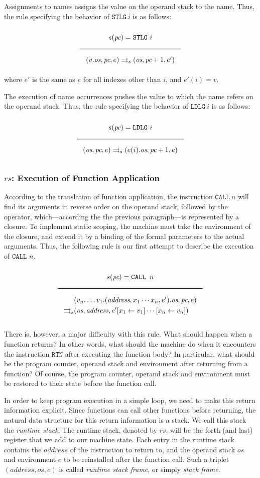\begin{appendices}
Assignments to names assigns the value on the operand stack to the name. Thus, the rule specifying the behavior of \(\texttt{STLG}\ i\) is as follows:

$$\Rule{s(\textit{pc}) = \texttt{STLG}\ i}{
(v.\textit{os},\textit{pc},e) \transition (\textit{os},\textit{pc}+1,e')}$$
where \(e'\) is the same as \(e\) for all indexes other than \(i\), and \(e'(i) = v\).

The execution of name occurrences pushes the value to which the name refers on the operand stack. Thus, the rule specifying the behavior of \(\texttt{LDLG}\ i\) is as follows:

$$\Rule{s(\textit{pc}) = \texttt{LDLG}\ i}{
(\textit{os},\textit{pc},e) \transition (e(i).\textit{os},\textit{pc}+1,e)}$$

\subsubsection{\(\textit{rs}\): Execution of Function Application}
\label{sec:org837eb1c}
According to the translation of function application, the instruction \(\texttt{CALL}\ n\) will find its arguments in reverse order on the operand stack, followed by the operator, which---according the the previous paragraph---is represented by a closure. To implement static scoping, the machine must take the environment of the closure, and extend it by a binding of the formal parameters to the actual arguments. Thus, the following rule is our first attempt to describe the execution of \(\texttt{CALL } n\).

$$\Rule{s(\textit{pc}) = \texttt{CALL } n}{
\begin{aligned}
&(v_n.\ldots v_1.(\textit{address},x_1\cdots x_n,e').\textit{os},\textit{pc},e)\\
\transition &(\textit{os},\textit{address},e'[x_1 \leftarrow v_1]\cdots[x_n \leftarrow v_n])
\end{aligned}}$$

There is, however, a major difficulty with this rule. What should happen when a function returns? In other words, what should the machine do when it encounters the instruction \(\texttt{RTN}\) after executing the function body? In particular, what should be the program counter, operand stack and environment after returning from a function? Of course, the program counter, operand stack and environment must be restored to their state before the function call.

In order to keep program execution in a simple loop, we need to make this return information explicit. Since functions can call other functions before returning, the natural data structure for this return information is a stack. We call this stack the \emph{runtime stack}. The runtime stack, denoted by \(\textit{rs}\), will be the forth (and last) register that we add to our machine state. Each entry in the runtime stack contains the \(\textit{address}\) of the instruction to return to, and the operand stack \(\textit{os}\) and environment \(e\) to be reinstalled after the function call. Such a triplet \((\textit{address},\textit{os},e)\) is called \emph{runtime stack frame}, or simply \emph{stack frame}.


\end{appendices}
